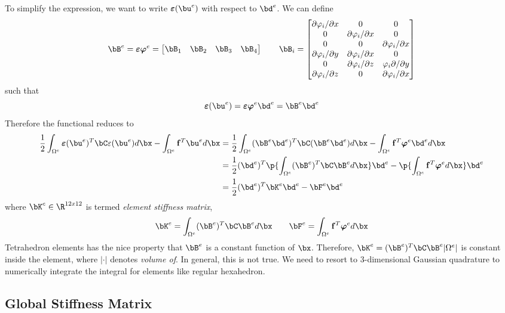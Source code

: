 \documentclass[11pt,titlepage]{article}
\newcommand{\bepsilon}{\boldsymbol{\varepsilon}}
\renewcommand{\epsilon}{\varepsilon}
\renewcommand{\bf}{\mathbf{f}}
\renewcommand{\bphi}{\boldsymbol{\varphi}}
\begin{document}
To simplify the expression, we want to write $\bepsilon(\bu^e)$ with respect to $\bd^e$. We can define 
\[
    \bB^e
    = \bepsilon \bphi^e
    = 
    \begin{bmatrix}
    \bB_1 & \bB_2 & \bB_3 & \bB_4 
    \end{bmatrix}
    \quad\quad
    \bB_i = 
    \begin{bmatrix}
        \partial \varphi_i / \partial x & 0 & 0 \\
        0 & \partial \varphi_i / \partial x & 0 \\
        0 & 0 & \partial \varphi_i / \partial x \\
        \partial \varphi_i / \partial y & \partial \varphi_i /\partial x & 0 \\
        0 & \partial \varphi_i / \partial z & \varphi_i \partial /\partial y \\
        \partial \varphi_i/ \partial z & 0 & \partial \varphi_i /\partial x \\
    \end{bmatrix}
\]
such that 
\[
    \bepsilon(\bu^e) = \bepsilon \bphi^e \bd^e = \bB^e \bd^e
\]
Therefore the functional reduces to 
\begin{align*}
    \frac{1}{2} \int_{\Omega^e} \bepsilon(\bu^e)^T \bC \epsilon(\bu^e) d\bx
    - \int_{\Omega^e} \bf^T \bu^e d\bx
    &= 
    \frac{1}{2} \int_{\Omega^e} (\bB^e\bd^e)^T \bC (\bB^e\bd^e) d\bx
    - \int_{\Omega^e} \bf^T \bphi^e\bd^e d\bx \\
    &=
    \frac{1}{2} (\bd^e)^T \p{\int_{\Omega^e} (\bB^e)^T \bC \bB^e d\bx} \bd^e
    - \p{ \int_{\Omega^e} \bf^T \bphi^e d\bx } \bd^e \\
    &= \frac{1}{2} (\bd^e)^T \bK^e \bd^e
    - \bF^e \bd^e
\end{align*}
where $\bK^e \in \R^{12x12}$ is termed \textit{element stiffness matrix},
\[
    \bK^e = \int_{\Omega^e} (\bB^e)^T \bC \bB^e d\bx
    \quad\quad
    \bF^e = \int_{\Omega^e} \bf^T \bphi^e d\bx
\]
Tetrahedron elements has the nice property that $\bB^e$ is a constant function of $\bx$. Therefore, $\bK^e = (\bB^e)^T \bC \bB^e |\Omega^e|$ is constant inside the element, where $|\cdot|$ denotes \textit{volume of}. In general, this is not true. We need to resort to 3-dimensional Gaussian quadrature to numerically integrate the integral for elements like regular hexahedron.


\subsection{Global Stiffness Matrix}
\end{document}
